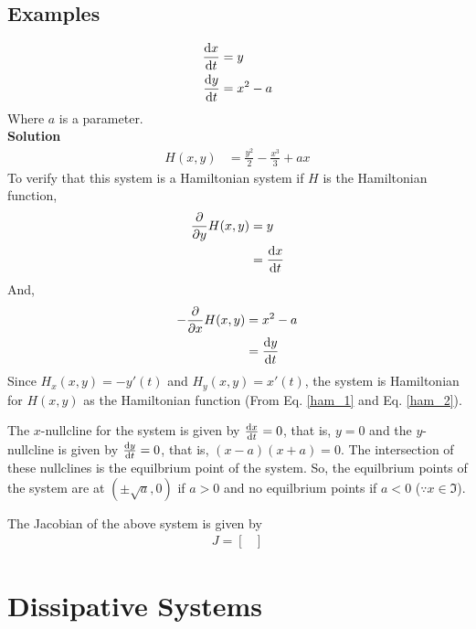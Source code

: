 \documentclass[12pt,1in]{article}
\newenvironment{Example}[2][Example]{\begin{trivlist}
		\item[\hskip \labelsep {\bfseries #1}\hskip \labelsep {\bfseries #2.}]}{\end{trivlist}}
\begin{document}
\subsection{Examples}
\begin{Example}{1}
	\begin{align*}
	\derivative{x}{t} &= y \\
	\derivative{y}{t} &= x^2 - a
	\end{align*}
	Where $a$ is a parameter. \\
	{\bfseries Solution\\}
	\begin{align*}
	H(x,y) &= \frac{y^2}{2} - \frac{x^3}{3} + ax
	\end{align*}
	To verify that this system is a Hamiltonian system if $H$ is the Hamiltonian function,
	\begin{align*}
	\frac{\partial}{\partial y}H(x,y) &= y\\
	&= \derivative{x}{t}
	\end{align*}
	And,
	\begin{align*}
	- \frac{\partial}{\partial x} H(x,y) &= x^2 - a\\
	&= \derivative{y}{t}
	\end{align*}
	Since $H_x(x,y) = - y'(t)$ and $H_y(x,y) = x'(t)$, the system is Hamiltonian for $H(x,y)$ as the Hamiltonian function (From Eq. \ref{ham_1} and Eq. \ref{ham_2}).
	
	
	The $x$-nullcline for the system is given by $\derivative{x}{t} = 0$, that is, $y = 0$ and the $y$-nullcline is given by $\derivative{y}{t}=0$, that is, $(x -a)(x+a) = 0$. The intersection of these nullclines is the equilbrium point of the system. So, the equilbrium points of the system are at $(\pm\sqrt{a}, 0)$ if $a > 0$ and no equilbrium points if $a < 0$ ($\because x \in \Im$).
	
	The Jacobian of the above system is given by 
	\begin{align*}
	J = \begin{bmatrix}
	\end{bmatrix}
	\end{align*} 
\end{Example}
\section{Dissipative Systems}



\end{document}

